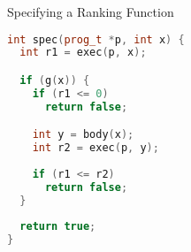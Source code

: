 \documentclass[xcolor=pdftex,t,11pt]{beamer}
\begin{document}
\begin{frame}[fragile]{Specifying a Ranking Function}
\vspace{-1em}

\begin{center}
\begin{minipage}{0.6\textwidth}
\begin{lstlisting}[language=c++,basicstyle=\small]
int spec(prog_t *p, int x) {
  int r1 = exec(p, x);

  if (g(x)) {
    if (r1 <= 0)
      return false;

    int y = body(x);
    int r2 = exec(p, y);
    
    if (r1 <= r2)
      return false;
  }
  
  return true;
}
\end{lstlisting}
\end{minipage}
\end{center}
\end{frame}

\iffalse

\section{Abstract Program Synthesis}
\begin{frame}{The Synthesis Formula}
Our high-level goal is to synthesise programs that meet some specification.

\pause

Abstractly, a program $P$ computes some function from an input set $I$ to an output set $O$:
$$P : I \rightarrow O$$

\pause

A specification is a relation between inputs and outputs:
$$\sigma \subseteq I \times O$$

\pause

The synthesis problem is to find a program that meets the specification on all inputs:
$$\exists P . \forall x \in I . \sigma(x, P(x))$$
\end{frame}
\fi
\end{document}
